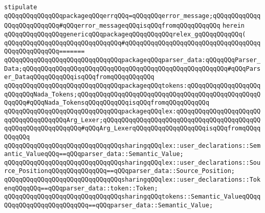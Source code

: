 \newline
\newline
\verb|stipulate|\newline
\verb|qQQqqQQqqQQqqQQqpackageqQQqerrqQQq=qQQqqQQqerror_message;qQQqqQQqqQQqqQQqqQQqqQQqqQQq#qQQqerror_messageqQQqisqQQqfromqQQqqQQqqQQq|\newline
\verb|herein|\newline
\newline
\verb|qQQqqQQqqQQqqQQqgenericqQQqpackageqQQqqQQqqQQqrelex_gqQQqqQQqqQQq(|\newline
\verb|qQQqqQQqqQQqqQQqqQQqqQQqqQQqqQQq#qQQqqQQqqQQqqQQqqQQqqQQqqQQqqQQqqQQqqQQqqQQqqQQqqQQq=======|\newline
\verb|qQQqqQQqqQQqqQQqqQQqqQQqqQQqqQQqpackageqQQqparser_data:qQQqqQQqParser_Data;qQQqqQQqqQQqqQQqqQQqqQQqqQQqqQQqqQQqqQQqqQQqqQQqqQQqqQQq#qQQqParser_DataqQQqqQQqqQQqisqQQqfromqQQqqQQqqQQq|\newline
\verb|qQQqqQQqqQQqqQQqqQQqqQQqqQQqqQQqpackageqQQqtokens:qQQqqQQqqQQqqQQqqQQqqQQqqQQqNada_Tokens;qQQqqQQqqQQqqQQqqQQqqQQqqQQqqQQqqQQqqQQqqQQqqQQqqQQqqQQq#qQQqNada_TokensqQQqqQQqqQQqisqQQqfromqQQqqQQqqQQq|\newline
\verb|qQQqqQQqqQQqqQQqqQQqqQQqqQQqqQQqpackageqQQqlex:qQQqqQQqqQQqqQQqqQQqqQQqqQQqqQQqqQQqqQQqArg_Lexer;qQQqqQQqqQQqqQQqqQQqqQQqqQQqqQQqqQQqqQQqqQQqqQQqqQQqqQQqqQQqqQQq#qQQqArg_LexerqQQqqQQqqQQqqQQqqQQqisqQQqfromqQQqqQQqqQQq|\newline
\newline
\verb|qQQqqQQqqQQqqQQqqQQqqQQqqQQqqQQqsharingqQQqlex::user_declarations::Semantic_ValueqQQq==qQQqparser_data::Semantic_Value;|\newline
\verb|qQQqqQQqqQQqqQQqqQQqqQQqqQQqqQQqsharingqQQqlex::user_declarations::Source_PositionqQQqqQQqqQQqqQQq==qQQqparser_data::Source_Position;|\newline
\verb|qQQqqQQqqQQqqQQqqQQqqQQqqQQqqQQqsharingqQQqlex::user_declarations::TokenqQQqqQQq==qQQqparser_data::token::Token;|\newline
\newline
\verb|qQQqqQQqqQQqqQQqqQQqqQQqqQQqqQQqsharingqQQqtokens::Semantic_ValueqQQqqQQqqQQqqQQqqQQqqQQqqQQq==qQQqparser_data::Semantic_Value;|\newline
